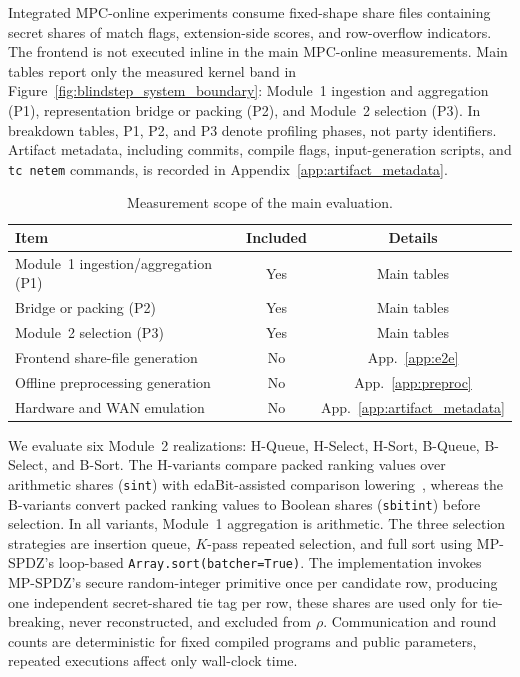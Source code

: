 \documentclass[conference,compsoc,letterpaper]{IEEEtran}
\theoremstyle{definition}
\theoremstyle{remark}
\newcommand{\policy}{\rho}
\newcommand{\HSort}{H-Sort}
\newcommand{\HQueue}{H-Queue}
\newcommand{\HSelect}{H-Select}
\newcommand{\BSort}{B-Sort}
\newcommand{\BQueue}{B-Queue}
\newcommand{\BSelect}{B-Select}
\begin{document}
Integrated MPC-online experiments consume fixed-shape share files
containing secret shares of match flags, extension-side scores, and
row-overflow indicators. The frontend is not executed inline in the main
MPC-online measurements. Main tables report only the measured kernel
band in Figure~\ref{fig:blindstep_system_boundary}: Module~1 ingestion and
aggregation (P1), representation bridge or packing (P2), and Module~2
selection (P3). In breakdown tables, P1, P2, and P3 denote profiling
phases, not party identifiers. Artifact metadata, including commits,
compile flags, input-generation scripts, and \texttt{tc netem} commands,
is recorded in Appendix~\ref{app:artifact_metadata}.

\begin{table}[t]
\centering
\small
\setlength{\tabcolsep}{4pt}
\renewcommand{\arraystretch}{1.08}
\caption{Measurement scope of the main evaluation.}
\label{tab:measurement_scope}
\begin{tabularx}{\columnwidth}{@{}Xcc@{}}
\toprule
\textbf{Item} & \textbf{Included} & \textbf{Details} \\
\midrule
Module~1 ingestion/aggregation (P1) & Yes & Main tables \\
Bridge or packing (P2)              & Yes & Main tables \\
Module~2 selection (P3)             & Yes & Main tables \\
Frontend share-file generation      & No  & App.~\ref{app:e2e} \\
Offline preprocessing generation    & No  & App.~\ref{app:preproc} \\
Hardware and WAN emulation          & No  & App.~\ref{app:artifact_metadata} \\
\bottomrule
\end{tabularx}
\vspace{-3mm}
\end{table}
We evaluate six Module~2 realizations: \HQueue{}, \HSelect{}, \HSort{},
\BQueue{}, \BSelect{}, and \BSort{}. The H-variants compare packed
ranking values over arithmetic shares (\texttt{sint}) with
edaBit-assisted comparison lowering~\cite{escudero2020improved}, whereas
the B-variants convert packed ranking values to Boolean shares
(\texttt{sbitint}) before selection. In all variants, Module~1
aggregation is arithmetic. The three selection strategies are insertion
queue, $K$-pass repeated selection, and full sort using MP-SPDZ's
loop-based \texttt{Array.sort(batcher=True)}. The implementation invokes
MP-SPDZ's secure random-integer primitive once per candidate row,
producing one independent secret-shared tie tag per row, these shares are
used only for tie-breaking, never reconstructed, and excluded from
$\policy$. Communication and round counts are deterministic for fixed
compiled programs and public parameters, repeated executions affect only
wall-clock time.
\end{document}
